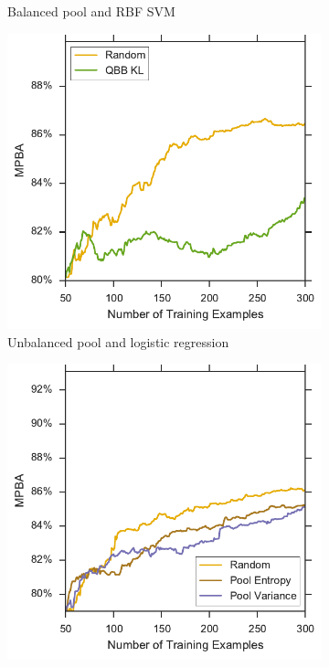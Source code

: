 \begin{figure}[p]
\begin{subfigure}{.5\textwidth}
		\caption{Balanced pool and RBF SVM}
		\label{fig:sdss_br_ind_lower}
	\end{subfigure}
	\begin{subfigure}{.5\textwidth}
		\centering
		\includegraphics[width=\textwidth]{figures/5_active/sdss_ul_ind_lower}
		\caption{Unbalanced pool and logistic regression}
		\label{fig:sdss_ul_ind_lower}
	\end{subfigure}%
	\begin{subfigure}{.5\textwidth}
		\centering
		\includegraphics[width=\linewidth]{figures/5_active/sdss_ur_ind_lower}

\end{subfigure}
\end{figure}
